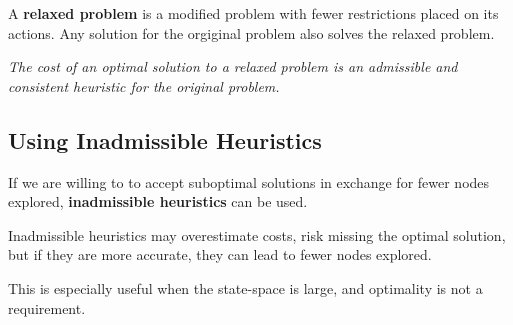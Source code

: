 \begin{multicols*}{2}
            A \textbf{relaxed problem} is a modified problem with fewer restrictions placed on its actions. Any solution for the orgiginal problem also solves the relaxed problem.

            \emph{The cost of an optimal solution to a relaxed problem is an admissible and consistent heuristic for the original problem.}

        \subsection{Using Inadmissible Heuristics}
            If we are willing to to accept suboptimal solutions in exchange for fewer nodes explored, \textbf{inadmissible heuristics} can be used.

            Inadmissible heuristics may overestimate costs, risk missing the optimal solution, but if they are more accurate, they can lead to fewer nodes explored.

            This is especially useful when the state-space is large, and optimality is not a requirement.

\end{multicols*}